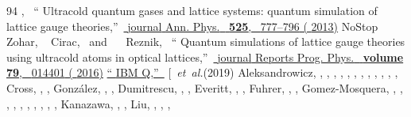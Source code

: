 \documentclass[twocolumn,showpacs,preprintnumbers,nofootinbib,amsmath,aps,pra,longbibliography,amssymb,superscriptaddress]{revtex4-1}
\begin{document}
\begin{thebibliography}{94}
{{			},\ } {\enquote {
			{{Ultracold quantum gases and lattice systems: quantum simulation of lattice
					gauge theories}},}\ }\href {\doibase 10.1002/andp.201300104} {\bibfield
		{journal} { {Ann. Phys.}\ }\textbf {
			{525}},\  {777--796} ( {2013})}\BibitemShut
	{NoStop}%
	\BibitemOpen
	 { {\ \bibnamefont
			{Zohar}},  {\ \bibnamefont
			{Cirac}}, \ and\  {\ \bibnamefont
			{Reznik}},\ } {\enquote { {{Quantum
					simulations of lattice gauge theories using ultracold atoms in optical
					lattices}},}\ }\href {\doibase 10.1088/0034-4885/79/1/014401} {\bibfield
		{journal} { {Reports Prog. Phys.}\ }\textbf {\bibinfo
			{volume} {79}},\  {014401} (
		{2016})}%
	\BibitemOpen
	\href {https://www.research.ibm.com/ibm-q/} {\enquote { {{IBM
					Q}},}\ }%
	\bibitem [{\ \emph {et~al.}(2019)\citenamefont
		{Aleksandrowicz}, , ,
		, , ,
		, ,
		, , ,
		, , \citenamefont
		{Cross}, , , \citenamefont
		{Gonz{\'{a}}lez}, , , \citenamefont
		{Dumitrescu}, , , \citenamefont
		{Everitt}, , , \citenamefont
		{Fuhrer}, , , \citenamefont
		{Gomez-Mosquera}, , ,
		, , ,
		, , ,
		, , \citenamefont
		{Kanazawa}, , , \citenamefont
		{Liu}, , , ,
}
\end{thebibliography}
\end{document}

